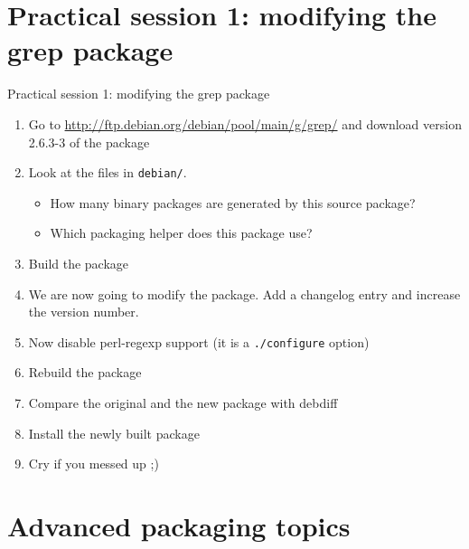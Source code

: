 \documentclass[10pt,final]{beamer}
\begin{document}
\section{Practical session 1: modifying the grep package}
\begin{frame}{Practical session 1: modifying the grep package}
  \begin{enumerate}
  \item Go to \url{http://ftp.debian.org/debian/pool/main/g/grep/} and
    download version 2.6.3-3 of the package
  \item Look at the files in \texttt{debian/}.
    \begin{itemize}
    \item 		How many binary packages are generated by this source package?
    \item 		Which packaging helper does this package use?
    \end{itemize}
  \item Build the package
  \item We are now going to modify the package. Add a changelog entry and increase the version number.
  \item Now disable perl-regexp support (it is a \texttt{./configure} option)
  \item Rebuild the package
  \item Compare the original and the new package with debdiff
  \item Install the newly built package
  \item Cry if you messed up ;)
  \end{enumerate}
\end{frame}

\section{Advanced packaging topics}
\end{document}
